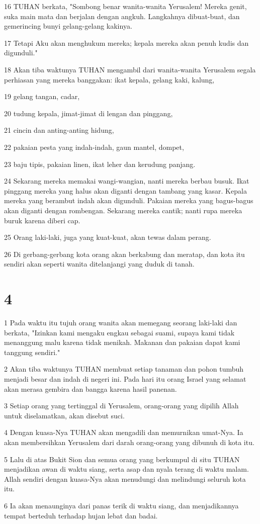 \par 16 TUHAN berkata, "Sombong benar wanita-wanita Yerusalem! Mereka genit, suka main mata dan berjalan dengan angkuh. Langkahnya dibuat-buat, dan gemerincing bunyi gelang-gelang kakinya.
\par 17 Tetapi Aku akan menghukum mereka; kepala mereka akan penuh kudis dan digunduli."
\par 18 Akan tiba waktunya TUHAN mengambil dari wanita-wanita Yerusalem segala perhiasan yang mereka banggakan: ikat kepala, gelang kaki, kalung,
\par 19 gelang tangan, cadar,
\par 20 tudung kepala, jimat-jimat di lengan dan pinggang,
\par 21 cincin dan anting-anting hidung,
\par 22 pakaian pesta yang indah-indah, gaun mantel, dompet,
\par 23 baju tipis, pakaian linen, ikat leher dan kerudung panjang.
\par 24 Sekarang mereka memakai wangi-wangian, nanti mereka berbau busuk. Ikat pinggang mereka yang halus akan diganti dengan tambang yang kasar. Kepala mereka yang berambut indah akan digunduli. Pakaian mereka yang bagus-bagus akan diganti dengan rombengan. Sekarang mereka cantik; nanti rupa mereka buruk karena diberi cap.
\par 25 Orang laki-laki, juga yang kuat-kuat, akan tewas dalam perang.
\par 26 Di gerbang-gerbang kota orang akan berkabung dan meratap, dan kota itu sendiri akan seperti wanita ditelanjangi yang duduk di tanah.

\chapter{4}

\par 1 Pada waktu itu tujuh orang wanita akan memegang seorang laki-laki dan berkata, "Izinkan kami mengaku engkau sebagai suami, supaya kami tidak menanggung malu karena tidak menikah. Makanan dan pakaian dapat kami tanggung sendiri."
\par 2 Akan tiba waktunya TUHAN membuat setiap tanaman dan pohon tumbuh menjadi besar dan indah di negeri ini. Pada hari itu orang Israel yang selamat akan merasa gembira dan bangga karena hasil panenan.
\par 3 Setiap orang yang tertinggal di Yerusalem, orang-orang yang dipilih Allah untuk diselamatkan, akan disebut suci.
\par 4 Dengan kuasa-Nya TUHAN akan mengadili dan memurnikan umat-Nya. Ia akan membersihkan Yerusalem dari darah orang-orang yang dibunuh di kota itu.
\par 5 Lalu di atas Bukit Sion dan semua orang yang berkumpul di situ TUHAN menjadikan awan di waktu siang, serta asap dan nyala terang di waktu malam. Allah sendiri dengan kuasa-Nya akan menudungi dan melindungi seluruh kota itu.
\par 6 Ia akan menaunginya dari panas terik di waktu siang, dan menjadikannya tempat berteduh terhadap hujan lebat dan badai.

